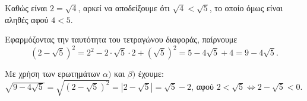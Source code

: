 
\begin{alist}
\item Καθώς είναι $2 = \sqrt{4}$, αρκεί να αποδείξουμε ότι $\sqrt{4} < \sqrt{5}$, το οποίο όμως είναι αληθές
αφού $4 < 5$.

\item Εφαρμόζοντας την ταυτότητα του τετραγώνου διαφοράς, παίρνουμε
\[(2 - \sqrt{5})^2 = 2^2 - 2 \cdot \sqrt{5} \cdot 2 + (\sqrt{5})^2 = 5 - 4\sqrt{5} + 4 = 9 - 4\sqrt{5}.\]

\item Με χρήση των ερωτημάτων $\alpha)$ και $\beta)$ έχουμε:
$\sqrt{9 - 4\sqrt{5}} = \sqrt{(2 - \sqrt{5})^2} = |2 - \sqrt{5}| = \sqrt{5} - 2$, αφού $2 < \sqrt{5} \Leftrightarrow 2 - \sqrt{5} < 0$.
\end{alist}

